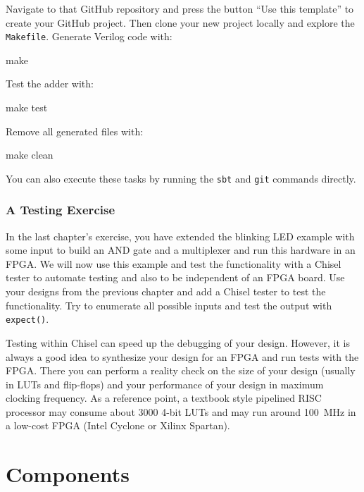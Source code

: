\documentclass[%
    10pt,
    headinclude, footexclude,
    openright, %
    notitlepage,
    cleardoubleempty,
    headsepline,
    pointlessnumbers,
    bibtotoc, idxtotoc,
    ]{scrbook}
\newcommand{\code}[1]{{\lstinline[basicstyle=\small\ttfamily]{#1}}}
\begin{document}
Navigate to that GitHub repository and press the button ``Use this template'' to create
your GitHub project. Then clone your new project locally and explore the \code{Makefile}.
Generate Verilog code with:

\begin{chisel}
make
\end{chisel}

\noindent Test the adder with:

\begin{chisel}
make test
\end{chisel}

\noindent Remove all generated files with:

\begin{chisel}
make clean
\end{chisel}

\noindent You can also execute these tasks by running the \code{sbt} and \code{git} commands directly.

\subsection{A Testing Exercise}

In the last chapter's exercise, you have extended the blinking LED example with some input
to build an AND gate and a multiplexer and run this hardware in an FPGA.
We will now use this example and test the functionality with a Chisel tester
to automate testing and also to be independent of an FPGA board.
Use your designs from the previous chapter and add a Chisel tester to test the functionality.
Try to enumerate all possible inputs and test the output with \code{expect()}.

Testing within Chisel can speed up the debugging of your design.
However, it is always a good idea to synthesize your design for an FPGA and run tests
with the FPGA. There you can perform a reality check on the size of your design (usually
in LUTs and flip-flops) and your performance of your design in maximum clocking frequency.
As a reference point, a textbook style pipelined RISC processor may consume about 3000
4-bit LUTs and may run around 100~MHz in a low-cost FPGA (Intel Cyclone or
Xilinx Spartan).


\chapter{Components}

\end{document}
